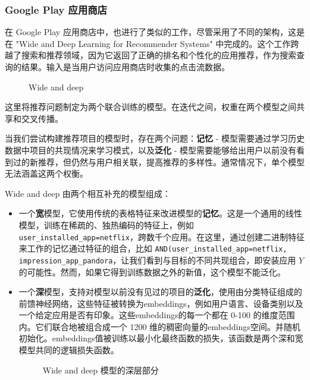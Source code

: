 \documentclass[Chinese, 11pt, table]{diazessay} %
\begin{document}
\begin{CJK}{UTF8}{gbsn}
\begin{sloppypar}
\subsubsection*{Google Play 应用商店}
在 Google Play 应用商店中，也进行了类似的工作，尽管采用了不同的架构，这是在 "Wide and Deep Learning for Recommender Systems" \citep{cheng2016wide} 中完成的。这个工作跨越了搜索和推荐领域，因为它返回了正确的排名和个性化的应用推荐，作为搜索查询的结果。输入是当用户访问应用商店时收集的点击流数据。

\begin{figure}[H]
\caption{Wide and deep \citep{cheng2016wide}}
\end{figure}

这里将推荐问题制定为两个联合训练的模型。在迭代之间，权重在两个模型之间共享和交叉传播。

当我们尝试构建推荐项目的模型时，存在两个问题：\textbf{记忆} - 模型需要通过学习历史数据中项目的共现情况来学习模式，以及\textbf{泛化} - 模型需要能够给出用户以前没有看到过的新推荐，但仍然与用户相关联，提高推荐的多样性。通常情况下，单个模型无法涵盖这两个权衡。

Wide and deep 由两个相互补充的模型组成：

\begin{itemize}
  \item 一个\textbf{宽}模型，它使用传统的表格特征来改进模型的\textbf{记忆}。这是一个通用的线性模型，训练在稀疏的、独热编码的特征上，例如 \texttt{user_installed_app=netflix}，跨数千个应用。在这里，通过创建二进制特征来工作的记忆通过特征的组合，比如 \texttt{AND(user_installed_app=netflix, impression_app_pandora}，让我们看到与目标的不同共现组合，即安装应用 $Y$ 的可能性。然而，如果它得到训练数据之外的新值，这个模型不能泛化。
  \item 一个\textbf{深}模型，支持对模型以前没有见过的项目的\textbf{泛化}，使用由分类特征组成的前馈神经网络，这些特征被转换为embeddings，例如用户语言、设备类别以及一个给定应用是否有印象。这些embeddings的每一个都在 0-100 的维度范围内。它们联合地被组合成一个 1200 维的稠密向量的embeddings空间。并随机初始化。embeddings值被训练以最小化最终函数的损失，该函数是两个深和宽模型共同的逻辑损失函数。
\begin{figure}[H]
\caption{Wide and deep 模型的深层部分 \citep{cheng2016wide}}
\end{figure}
\end{itemize}


\end{sloppypar}
\end{CJK}
\end{document}
